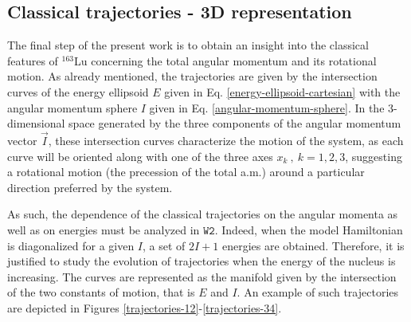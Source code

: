 \documentclass[myclassdoc,debug]{rjparticle}
\begin{document}
\subsection{Classical trajectories - 3D representation}\label{classical-trajectories}

The final step of the present work is to obtain an insight into the classical features of $^{163}$Lu concerning the total angular momentum and its rotational motion. As already mentioned, the trajectories are given by the intersection curves of the energy ellipsoid $E$ given in Eq. \ref{energy-ellipsoid-cartesian} with the angular momentum sphere $I$ given in Eq. \ref{angular-momentum-sphere}. In the 3-dimensional space generated by the three components of the angular momentum vector $\vec{I}$, these intersection curves characterize the motion of the system, as each curve will be oriented along with one of the three axes $x_k\ ,\ k=1,2,3$, suggesting a rotational motion (the precession of the total a.m.) around a particular direction preferred by the system.

As such, the dependence of the classical trajectories on the angular momenta as well as on energies must be analyzed in $\texttt{W2}$. Indeed, when the model Hamiltonian is diagonalized for a given $I$, a set of $2I+1$ energies are obtained. Therefore, it is justified to study the evolution of trajectories when the energy of the nucleus is increasing. The curves are represented as the manifold given by the intersection of the two constants of motion, that is $E$ and $I$. An example of such trajectories are depicted in Figures \ref{trajectories-12}-\ref{trajectories-34}.
\end{document}
